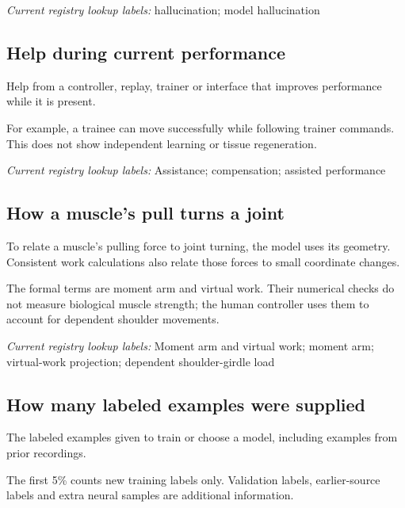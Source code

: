 \noindent\textit{Current registry lookup labels:} hallucination; model hallucination\par

\subsection*{Help during current performance}
\noindent Help from a controller, replay, trainer or interface that improves performance while it is present.\par
\noindent For example, a trainee can move successfully while following trainer commands. This does not show independent learning or tissue regeneration.\par

\noindent\textit{Current registry lookup labels:} Assistance; compensation; assisted performance\par

\begin{samepage}
\subsection*{How a muscle’s pull turns a joint}
\noindent To relate a muscle’s pulling force to joint turning, the model uses its geometry. Consistent work calculations also relate those forces to small coordinate changes.\par
\end{samepage}
\begin{samepage}
\noindent The formal terms are moment arm and virtual work. Their numerical checks do not measure biological muscle strength; the human controller uses them to account for dependent shoulder movements.\par\nopagebreak[4]

\end{samepage}


\noindent\textit{Current registry lookup labels:} Moment arm and virtual work; moment arm; virtual-work projection; dependent shoulder-girdle load\par

\begin{samepage}
\subsection*{How many labeled examples were supplied}
\noindent The labeled examples given to train or choose a model, including examples from prior recordings.\par
\end{samepage}
\begin{samepage}
\noindent The first 5\% counts new training labels only. Validation labels, earlier-source labels and extra neural samples are additional information.\par\nopagebreak[4]

\end{samepage}


